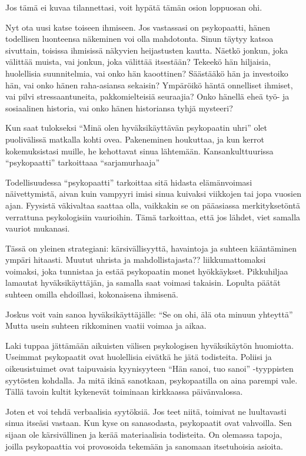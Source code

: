 Jos tämä ei kuvaa tilannettasi, voit hypätä tämän osion loppuosan ohi.

Nyt ota uusi katse toiseen ihmiseen. Jos vastassasi on psykopaatti, hänen todellisen luonteensa näkeminen voi olla mahdotonta. Sinun täytyy katsoa sivuttain, toisissa ihmisissä näkyvien heijastusten kautta. Näetkö jonkun, joka välittää muista, vai jonkun, joka välittää itsestään? Tekeekö hän hiljaisia, huolellisia suunnitelmia, vai onko hän kaoottinen? Säästääkö hän ja investoiko hän, vai onko hänen raha-asiansa sekaisin? Ympäröikö häntä onnelliset ihmiset, vai pilvi stressaantuneita, pakkomielteisiä seuraajia? Onko hänellä eheä työ- ja sosiaalinen historia, vai onko hänen historiansa tyhjä mysteeri?

Kun saat tulokseksi ``Minä olen hyväksikäyttävän psykopaatin uhri\vmq{,}'' olet puolivälissä matkalla kohti ovea. Pakeneminen houkuttaa, ja kun kerrot kokemuksistasi muille, he kehottavat sinua lähtemään. Kansankulttuurissa ``psykopaatti'' tarkoittaaa ``sarjamurhaaja''

Todellisuudessa ``psykopaatti'' tarkoittaa sitä hidasta elämänvoimasi näivettymistä, aivan kuin vampyyri imisi sinua kuivaksi viikkojen tai jopa vuosien ajan. Fyysistä väkivaltaa saattaa olla, vaikkakin se on pääasiassa merkityksetöntä verrattuna psykologisiin vaurioihin. Tämä tarkoittaa, että jos lähdet, viet samalla vauriot mukanasi.

Tässä on yleinen strategiani: kärsivällisyyttä, havaintoja ja suhteen kääntäminen ympäri hitaasti. Muutut uhrista ja mahdollistajasta?? liikkumattomaksi voimaksi, joka tunnistaa ja estää psykopaatin monet hyökkäykset. Pikkuhiljaa lamautat hyväksikäyttäjän, ja samalla saat voimasi takaisin. Lopulta päätät suhteen omilla ehdoillasi, kokonaisena ihmisenä.

Joskus voit vain sanoa hyväksikäyttäjälle: ``Se on ohi, älä ota minuun yhteyttä'' Mutta usein suhteen rikkominen vaatii voimaa ja aikaa.

Laki tuppaa jättämään aikuisten välisen psykologisen hyväksikäytön huomiotta. Useimmat psykopaatit ovat huolellisia eivätkä he jätä todisteita. Poliisi ja oikeusistuimet ovat taipuvaisia kyynisyyteen ``Hän sanoi, tuo sanoi'' -tyyppisten syytösten kohdalla. Ja mitä ikinä sanotkaan, psykopaatilla on aina parempi vale. Tällä tavoin kultit kykenevät toiminaan kirkkaassa päivänvalossa.

Joten et voi tehdä verbaalisia syytöksiä. Jos teet niitä, toimivat ne luultavasti sinua itseäsi vastaan. Kun kyse on sanasodasta, psykopaatit ovat vahvoilla. Sen sijaan ole kärsivällinen ja kerää materiaalisia todisteita. On olemassa tapoja, joilla psykopaattia voi provosoida tekemään ja sanomaan itsetuhoisia asioita.

